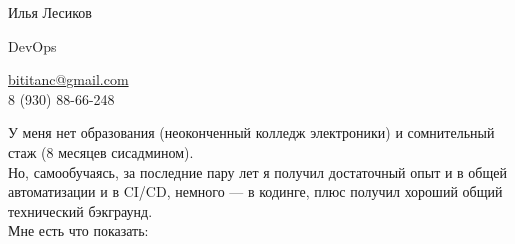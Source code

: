 \documentclass[$fontsize$, a4paper]{article}
\begin{document}
\begin{spacing}{0.3}
{\LARGE Илья Лесиков}\\
\end{spacing}


{\setlength\multicolsep{0pt}%
\begin{multicols}{2}





\begin{spacing}{0.7}
  {\large DevOps}\hspace{1.55cm}{25 лет}\\
\end{spacing}

\columnbreak

\begin{flushright}
    \href{mailto:bititanc@gmail.com}{bititanc@gmail.com}\\
    8 (930) 88-66-248\\
\end{flushright}

\end{multicols}
}

\vspace{30pt}

У меня нет образования (неоконченный колледж электроники) и сомнительный стаж (8 месяцев сисадмином).\\
Но, самообучаясь, за последние пару лет я получил достаточный опыт и в общей автоматизации и в CI/CD, немного — в кодинге, плюс получил хороший общий технический бэкграунд.\\
Мне есть что показать:\\
\end{document}
